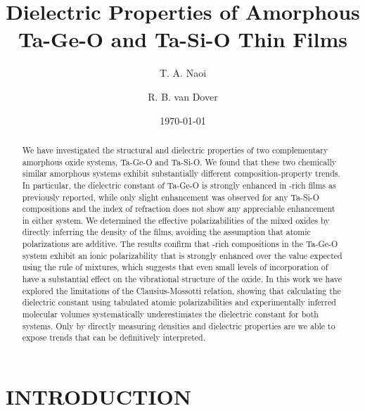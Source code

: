 \documentclass[aip,jap,numerical,citeautoscript,preprint]{revtex4-1}
\begin{document}
\title{Dielectric Properties of Amorphous Ta-Ge-O and Ta-Si-O Thin Films} 

\author{T. A. Naoi}

\author{R. B. van Dover}

\date{\today}

\begin{abstract}

We have investigated the structural and dielectric properties of two complementary amorphous oxide systems, Ta-Ge-O and Ta-Si-O. We found that these two chemically similar amorphous systems exhibit substantially different composition-property trends. In particular, the dielectric constant of Ta-Ge-O is strongly enhanced in -rich films as previously reported, while only slight enhancement was observed for any Ta-Si-O compositions and the index of refraction does not show any appreciable enhancement in either system. We determined the effective polarizabilities of the mixed oxides by directly inferring the density of the films, avoiding the assumption that atomic polarizations are additive. The results confirm that -rich compositions in the Ta-Ge-O system exhibit an ionic polarizability that is strongly enhanced over the value expected using the rule of mixtures, which suggests that even small levels of incorporation of  have a substantial effect on the vibrational structure of the oxide. In this work we have explored the limitations of the Clausius-Mossotti relation, showing that calculating the dielectric constant using tabulated atomic polarizabilities and experimentally inferred molecular volumes systematically underestimates the dielectric constant for both systems. Only by directly measuring densities and dielectric properties are we able to expose trends that can be definitively interpreted.
	
\end{abstract}
\maketitle 

\section{INTRODUCTION} 
\end{document}
